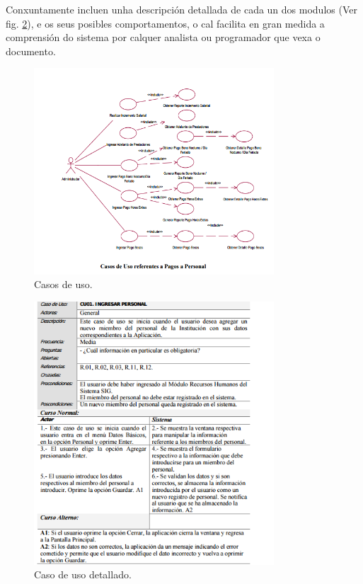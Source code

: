 \documentclass[DIV=calc,paper=a4,fontsize=11pt,onecolumn]{scrartcl}	 %
\begin{document}
Conxuntamente incluen unha descripción detallada de cada un dos modulos (Ver fig. \ref{fig:cu}), e os seus posibles comportamentos, o cal facilita en gran medida a comprensión do sistema por calquer analista ou programador que vexa o documento.\cite{ENAHP}
\begin{figure}[ht]
\centering
\includegraphics[width=0.8\textwidth]{./figuras/estaticaBien.png}
\caption{Casos de uso.}
\label{fig:estBien}
\end{figure}
\begin{figure}[h]
\centering
\includegraphics[width=0.8\textwidth]{./figuras/cu.png}
\caption{Caso de uso detallado.}
\label{fig:cu}
\end{figure}
\end{document}
